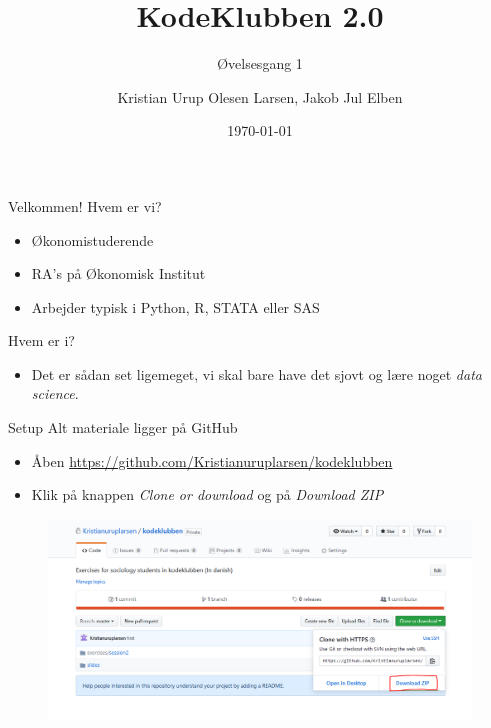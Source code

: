 \documentclass[10pt]{beamer}
\title{KodeKlubben 2.0}
\subtitle{Øvelsesgang 1}
\date{\today}
\author{Kristian Urup Olesen Larsen, Jakob Jul Elben}
\institute{Økonomisk Institut, KU}
\begin{document}
\maketitle

\begin{frame}[fragile]{Velkommen!}
Hvem er vi?
\begin{itemize}
  \item Økonomistuderende
  \item RA's på Økonomisk Institut
  \item Arbejder typisk i Python, R, STATA eller SAS
\end{itemize}
Hvem er i?
\begin{itemize}
  \item Det er sådan set ligemeget, vi skal bare have det sjovt og lære noget \textit{data science}.
\end{itemize}
\end{frame}

\begin{frame}[fragile]{Setup}
  Alt materiale ligger på GitHub
\begin{itemize}
  \item Åben \href{https://github.com/Kristianuruplarsen/kodeklubben}{https://github.com/Kristianuruplarsen/kodeklubben}
  \item Klik på knappen \textit{Clone or download} og på \textit{Download ZIP}
\end{itemize}

\begin{figure}
  \center
  \includegraphics[width=\textwidth]{figs/setup.PNG}
\end{figure}
\end{frame}
\end{document}
